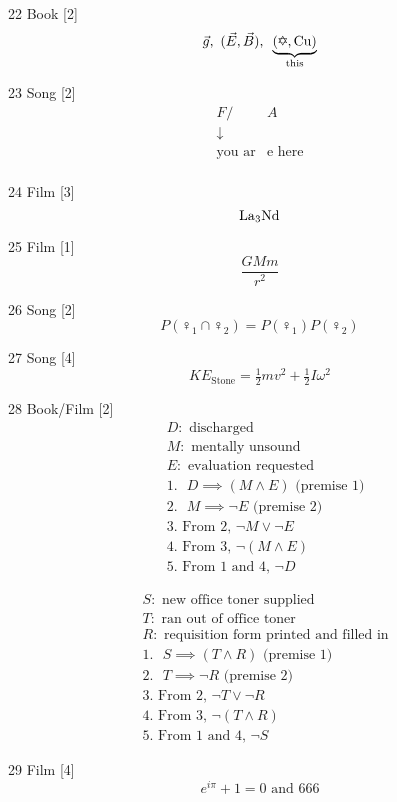 \documentclass[10pt]{article}
\begin{document}
  22 Book [2]
  \[
  \vec{g}, \text{ } (\vec{E}, \vec{B}), \text{ } \underbrace{(\text{\ding{65}},\text{Cu})}_{\text{this}}
  \]

  23 Song [2]
  \[\begin{split}
  F_{}/&A\\
  \downarrow&\\
  \text{you ar}&\text{e here} \\
  \end{split}
  \]
   
  24 Film [3]
   \[
   \ce{La3Nd}
   \]
   
  25  Film [1]
   \[
  \frac{GMm}{r^2}
   \]
   
   
   26 Song [2]
   \[
   P(\female_1 \cap \female_2) = P(\female_1)P(\female_2)
   \]
   
  27 Song [4]
   \[
   KE_{\text{Stone}} = \tfrac12 m v^2 + \tfrac12 I \omega^2
   \]
   
  28 Book/Film [2]
   \[
   \begin{split}
  & D: \text{ discharged}\\
  & M: \text{ mentally unsound} \\
  & E: \text{ evaluation requested} \\
  &1. \text{ }D \implies (M \land E) \text{ (premise 1)} \\
  &2. \text{ }M \implies \neg E \text{ (premise 2)} \\
  &3. \text{ From 2, } \neg M \lor \neg E \\
     &4. \text{ From 3, } \neg(M \land E) \\
  &5. \text{ From 1 and 4, } \neg D 
  \end{split}
  \]

\[
   \begin{split}
  & S: \text{ new office toner supplied}\\
  & T: \text{ ran out of office toner} \\
  & R: \text{ requisition form printed and filled in} \\
  &1. \text{ }S \implies (T \land R) \text{ (premise 1)} \\
  &2. \text{ }T \implies \neg R \text{ (premise 2)} \\
  &3. \text{ From 2, } \neg T \lor \neg R \\
  &4. \text{ From 3, } \neg(T \land R) \\
  &5. \text{ From 1 and 4, } \neg S
  \end{split}
  \]


  29 Film [4]
  \[
  e^{i\pi} + 1 = 0 \text{ and } 666
  \]
\end{document}
